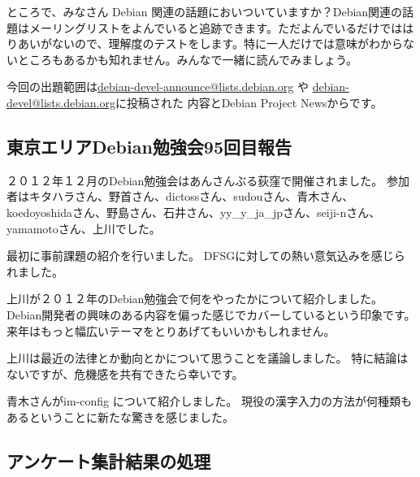 \documentclass[mingoth,a4paper]{jsarticle}
\begin{document}

ところで、みなさん Debian 関連の話題においついていますか？Debian関連の話
題はメーリングリストをよんでいると追跡できます。ただよんでいるだけではは
りあいがないので、理解度のテストをします。特に一人だけでは意味がわからな
いところもあるかも知れません。みんなで一緒に読んでみましょう。

今回の出題範囲は\url{debian-devel-announce@lists.debian.org} や \url{debian-devel@lists.debian.org}に投稿された
内容とDebian Project Newsからです。

\begin{multicols}{2}

\end{multicols}

\subsection{東京エリアDebian勉強会95回目報告}

２０１２年１２月のDebian勉強会はあんさんぶる荻窪で開催されました。
参加者はキタハラさん、野首さん、dictossさん、sudouさん、青木さん、
koedoyoshidaさん、野島さん、石井さん、yy\_y\_ja\_jpさん、seiji-nさん、
yamamotoさん、上川でした。

最初に事前課題の紹介を行いました。
DFSGに対しての熱い意気込みを感じられました。

上川が２０１２年のDebian勉強会で何をやったかについて紹介しました。
Debian開発者の興味のある内容を偏った感じでカバーしているという印象です。
来年はもっと幅広いテーマをとりあげてもいいかもしれません。

上川は最近の法律とか動向とかについて思うことを議論しました。
特に結論はないですが、危機感を共有できたら幸いです。

青木さんがim-config について紹介しました。
現役の漢字入力の方法が何種類もあるということに新たな驚きを感じました。


\subsection{アンケート集計結果の処理}
\end{document}
